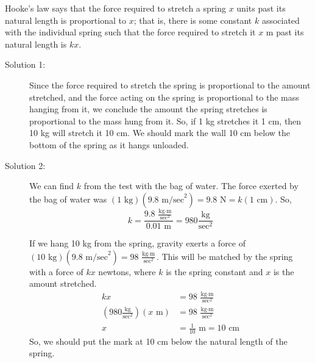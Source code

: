 \begin{solution}
Hooke's law says that the force required to stretch a spring $x$ units past its natural length is proportional to $x$; that is, there is some constant $k$ associated with the individual spring such that the force required to stretch it $x$ m past its natural length is $kx$.
\begin{description}
\item[Solution 1:]
Since the force required to stretch the spring is proportional to the amount stretched, and the force acting on the spring is proportional to the mass hanging from it, we conclude the amount the spring stretches is proportional to the mass hung from it. So, if 1 kg stretches it 1 cm, then 10 kg will stretch it 10 cm. We should mark the wall 10 cm below the bottom of the spring as it hangs unloaded.

\item[Solution 2:]
We can find $k$ from the test with the bag of water. The force exerted by the bag of water was $(1\text{ kg})(9.8\text{ m/sec}^2) = 9.8$ N$=k(1 \text{ cm})$. So,
\[k = \frac{9.8~\frac{\text{kg}\cdot\text{m}}{\text{sec}^2}}{0.01\text{ m}} = 980 \frac{\text{kg}}{\text{sec}^2}\]

If we hang 10 kg from the spring, gravity exerts a force of $(10 \text{ kg})(9.8 \text{ m/sec}^2) = 98~\frac{\text{kg}\cdot\text{m}}{\text{sec}^2}$. This will be matched by the spring with a force of $kx$ newtons, where $k$ is the spring constant and $x$ is the amount stretched.
\begin{align*}
kx&=98~\frac{\text{kg}\cdot\text{m}}{\text{sec}^2}\\
\left(980 \frac{\text{kg}}{\text{sec}^2}\right)\left(x\text{ m}\right)&=98~\frac{\text{kg}\cdot\text{m}}{\text{sec}^2}\\
x&=\frac{1}{10}\text{ m} = 10\text{ cm}
\end{align*}
So, we should put the mark at 10 cm below the natural length of the spring.
\end{description}
\end{solution}


